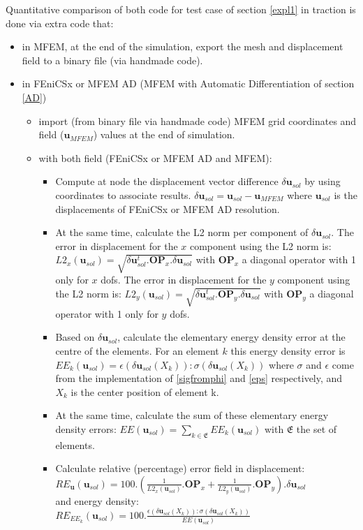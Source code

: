 \documentclass[12pt]{article}
\newcommand{\f}[1]{FEniCSx#1}
\newcommand{\vm}[1]{
	{\ensuremath{\mathbf{#1}}}
}
\newcommand{\tens}[1]{
	{\ensuremath{\mathsf{#1}}}
}
\begin{document}
\clearpage

Quantitative comparison of both code for test case of section \ref{expl1} in traction  is done via extra code that:


\begin{itemize}
	\item in MFEM, at the end of the simulation, export the mesh and displacement field to a binary file (via handmade code).
	\item in \f{} or MFEM AD (MFEM with Automatic Differentiation of section \ref{AD})
	\begin{itemize}
		\item  import (from binary file via handmade code) MFEM grid coordinates and field ($\vm{u}_{MFEM}$) values at the end of simulation.
		\item with both field (\f{} or MFEM AD  and MFEM):
		\begin{itemize}
			\item  Compute at node the displacement vector difference $\delta \vm{u}_{sol}$ by using coordinates to associate results. $\delta \vm{u}_{sol}=\vm{u}_{sol}-\vm{u}_{MFEM}$ where $\vm{u}_{sol}$ is the displacements of \f{} or MFEM AD  resolution.
		\item At the same time, calculate the L2 norm per component of $\delta \vm{u}_{sol}$. The error in displacement for the $x$ component using the L2 norm is:   $L2_x(\vm{u}_{sol})=\sqrt{\delta \vm{u}_{sol}^t.\vm{OP}_x.\delta \vm{u}_{sol}}$ with $\vm{OP}_x$ a diagonal operator with 1 only for $x$ dofs. The error in displacement for the $y$ component using the L2 norm is: $L2_y(\vm{u}_{sol})=\sqrt{\delta \vm{u}_{sol}^t.\vm{OP}_y.\delta \vm{u}_{sol}}$ with $\vm{OP}_y$ a diagonal operator with 1 only for $y$ dofs.
		\item Based on $\delta \vm{u}_{sol}$, calculate the elementary energy density error at the centre of the elements.
		For an element $k$ this energy density  error is  $EE_{k}(\vm{u}_{sol})= \tens{\epsilon}\left( \delta \vm{u}_{sol}(X_k)\right):\tens{\sigma} \left( \delta \vm{u}_{sol}(X_k) \right)$ where $\tens{\sigma}$ and $\tens{\epsilon}$ come from the implementation of \eqref{sigfromphi} and \eqref{eps} respectively, and $X_k$ is the center position of element k.
		\item At the same time, calculate the sum of these elementary energy density errors: $EE(\vm{u}_{sol})=\displaystyle\sum_{k\in \mathfrak{E}}EE_{k}(\vm{u}_{sol})$ with $\mathfrak{E}$ the set of elements.
		\item Calculate relative (percentage) error field in displacement:\\
		$RE_{\vm{u}}(\vm{u}_{sol})=100.\left( \frac{1}{L2_x(\vm{u}_{sol})}.\vm{OP}_x+\frac{1}{L2_y(\vm{u}_{sol})}.\vm{OP}_y\right).\delta \vm{u}_{sol}$\\
		 and energy density:\\ $RE_{EE_k}(\vm{u}_{sol})=100.\frac{ \tens{\epsilon}\left( \delta \vm{u}_{sol}(X_k)\right):\tens{\sigma} \left( \delta \vm{u}_{sol} (X_k) \right)}{EE(\vm{u}_{sol})}$
	\end{itemize}	\end{itemize}	
\end{itemize} 
\end{document}
